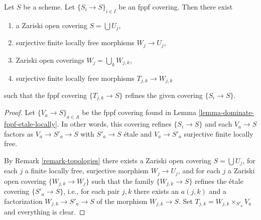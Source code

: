 \begin{lemma}
\label{lemma-dominate-fppf}
Let $S$ be a scheme. Let $\{S_i \to S\}_{i \in I}$ be an fppf covering.
Then there exist
\begin{enumerate}
\item a Zariski open covering $S = \bigcup U_j$,
\item surjective finite locally free morphisms $W_j \to U_j$,
\item Zariski open coverings $W_j = \bigcup_k W_{j, k}$,
\item surjective finite locally free morphisms $T_{j, k} \to W_{j, k}$
\end{enumerate}
such that the fppf covering $\{T_{j, k} \to S\}$ refines the given
covering $\{S_i \to S\}$.
\end{lemma}

\begin{proof}
Let $\{V_a \to S\}_{a \in A}$ be the fppf covering found in
Lemma \ref{lemma-dominate-fppf-etale-locally}.
In other words, this covering refines
$\{S_i \to S\}$
and each $V_a \to S$ factors as
$V_a \to S'_a \to S$ with $S'_a \to S$ \'etale and $V_a \to S'_a$
surjective finite locally free.

\medskip\noindent
By
Remark \ref{remark-topologies}
there exists a Zariski open covering $S = \bigcup U_j$,
for each $j$ a finite locally free, surjective morphism
$W_j \to U_j$, and for each $j$ a Zariski open covering
$\{W_{j, k} \to W_j\}$ such that the family
$\{W_{j, k} \to S\}$ refines the \'etale covering
$\{S'_a \to S\}$, i.e., for each pair $j, k$ there exists
an $a(j, k)$ and a factorization $W_{j, k} \to S'_a \to S$
of the morphism $W_{j, k} \to S$. Set
$T_{j, k} = W_{j, k} \times_{S'_a} V_a$ and everything is clear.
\end{proof}
